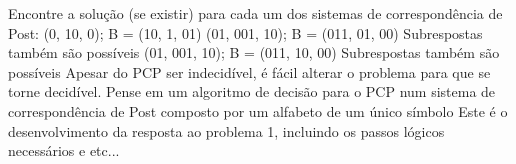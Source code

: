 \documentclass[12pt,a4paper]{article}
\begin{document}
\problem Encontre a solução (se existir) para cada um dos sistemas de correspondência de Post:
	\subproblem (0, 10, 0); B = (10, 1, 01)
	\subproblem (01, 001, 10); B = (011, 01, 00)
	\subanswer Subrespostas também são possíveis
	\subproblem (01, 001, 10); B = (011, 10, 00)
	\subanswer Subrespostas também são possíveis
\problem Apesar do PCP ser indecidível, é fácil alterar o problema para que se torne decidível. Pense em um algoritmo de decisão para o PCP num sistema de correspondência de Post composto por um alfabeto de um único símbolo
\answer Este é o desenvolvimento da resposta ao problema 1, incluindo os passos lógicos necessários e etc...
\end{document}
